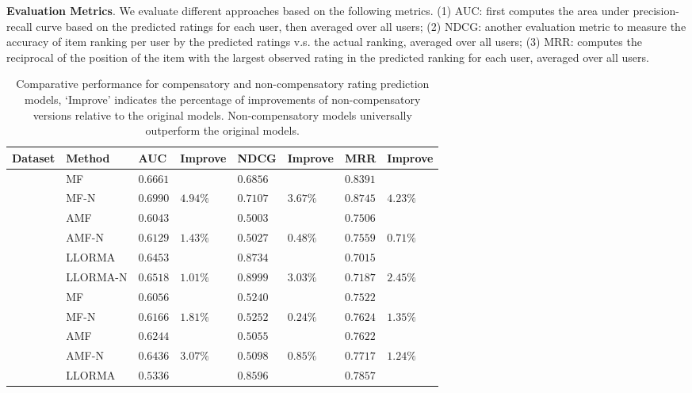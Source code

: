 \documentclass[letterpaper]{article} %
\begin{document}
\textbf{Evaluation Metrics}.  We evaluate different approaches based on the following metrics. (1) AUC: first computes the area under precision-recall curve based on the predicted ratings for each user, then averaged over all users; (2) NDCG: another evaluation metric to measure the accuracy of item ranking per user by the predicted ratings v.s. the actual ranking, averaged over all users;  (3)  MRR: computes the reciprocal of the position of the item with the largest observed rating in the predicted ranking for each user, averaged over all users. 

\begin{table}[htp]
\tiny
\caption{Comparative performance for compensatory and non-compensatory rating prediction models, `Improve' indicates the percentage of improvements of non-compensatory versions relative to the original models. Non-compensatory models universally outperform the original models.}
\begin{center}
\begin{tabular}{p{0.4cm}<{\centering}|p{1.2cm}<{\centering} |p{0.5cm} p{0.6cm} |p{0.5cm} p{0.6cm} |p{0.5cm} p{0.6cm}}
\hline
Dataset	& Method	& AUC	& Improve&	NDCG&	Improve&	MRR	&Improve\\\hline
{} &	MF	& $0.6661$ 	& &	$0.6856$ 	&&	$0.8391$ 	&\\
	&MF-N	&$0.6990$ &	$4.94\%$	&$0.7107 $	&$3.67\%$	&$0.8745$ &	$4.23\%$	\\
	&AMF&	$0.6043$ 	&&	$0.5003$ 	&&	$0.7506$ &\\
	&AMF-N	&$0.6129$ 	&$1.43\%$	&$0.5027$ &	$0.48\%$	&$0.7559$ 	&$0.71\%$	\\
	&LLORMA		&$0.6453$&	&$0.8734$ 	&&	$0.7015$&\\	
	&LLORMA-N	&$0.6518$	&$1.01\%$	&	$0.8999$ 	&$3.03\%$	&$0.7187$ 	&$2.45\%$	\\
	\hline
{}	&MF	&$0.6056 $	&&	$0.5240$&&		$0.7522 $	&	\\
	&MF-N&	$0.6166$ 	&$1.81\%$	&$0.5252$ 	&$0.24\%$	&$0.7624$ 	&$1.35\%$\\
	&AMF	&$0.6244 $	&&	$0.5055 $&&		$0.7622 $	&	\\
	&AMF-N	&$0.6436$ 	&$3.07\%$	&$0.5098$ 	&$0.85\%$	&$0.7717$ 	&$1.24\%$	\\
	&LLORMA	&$0.5336$& &		$0.8596$ 	&&	$0.7857$ 	&	\\

\end{tabular}
\end{center}
\end{table}
\end{document}
